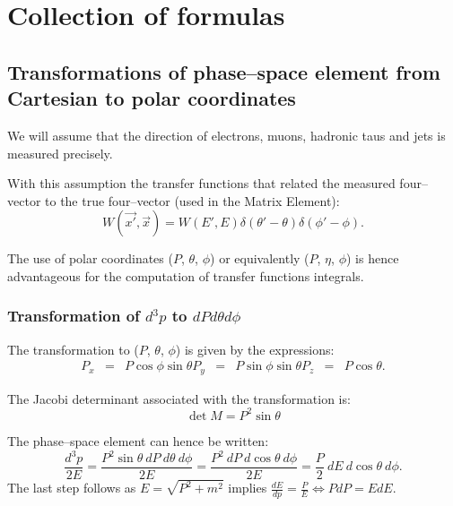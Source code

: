 \section{Collection of formulas}
\label{sec:appendix_collection_of_formulas}

\subsection{Transformations of phase--space element from Cartesian to polar coordinates}

We will assume that the direction of electrons, muons, hadronic taus and jets is measured precisely.

With this assumption the transfer functions that related the measured four--vector  to the true four--vector  (used in the Matrix Element):
\begin{equation*}
W(\vec{x'}, \vec{x}) = W(E', E) \delta(\theta' - \theta) \delta(\phi' - \phi).
\end{equation*}

The use of polar coordinates ($P$, $\theta$, $\phi$) or equivalently ($P$, $\eta$, $\phi$) 
is hence advantageous for the computation of transfer functions integrals.

\subsubsection{Transformation of $d^{3}p$ to $dP d\theta d\phi$}
\label{sec:transformation_to_polar_coordinates}

The transformation to ($P$, $\theta$, $\phi$) is given by the expressions:
\begin{eqnarray*}
P_{x} & = & P \cos \phi \sin \theta
P_{y} & = & P \sin \phi \sin \theta
P_{z} & = & P \cos \theta.
\end{eqnarray*}

The Jacobi determinant associated with the transformation is:
\begin{equation*}
\det M = P^2 \sin \theta
\end{equation*}

The phase--space element can hence be written:
\begin{equation*}
\frac{d^3p}{2 E} = \frac{{P^2 \sin\theta \ dP \ d\theta \ d\phi}}{2 E} = \frac{{P^2 \ dP \ d\cos\theta \ d\phi}}{2 E} = \frac{P}{2} \ dE \ d\cos\theta \ d\phi.
\end{equation*}
The last step follows as $E = \sqrt{P^2 + m^2}$ implies $\frac{dE}{dp} = \frac{P}{E} \Leftrightarrow P dP = E dE$.

